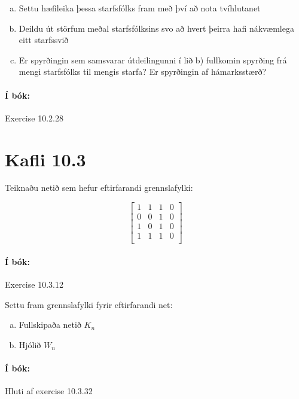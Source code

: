 \documentclass{exam}
\begin{document}
\begin{questions}
\begin{enumerate}[a)]
 \item Settu hæfileika þessa starfsfólks fram með því að nota tvíhlutanet
 \item Deildu út störfum meðal starfsfólksins svo að hvert þeirra hafi nákvæmlega eitt starfssvið
 \item Er spyrðingin sem samsvarar útdeilingunni í lið b) fullkomin spyrðing frá mengi starfsfólks til mengis starfa? Er spyrðingin af hámarksstærð?
\end{enumerate}

\paragraph{Í bók:} Exercise 10.2.28

\section{Kafli 10.3}

\question Teiknaðu netið sem hefur eftirfarandi grennslafylki:

\[
\begin{bmatrix}
1&1&1&0\\
0&0&1&0\\
1&0&1&0\\
1&1&1&0\\
\end{bmatrix}
\]

\paragraph{Í bók:} Exercise 10.3.12

\question Settu fram grennslafylki fyrir eftirfarandi net:

\begin{enumerate}[a)]
 \item Fullskipaða netið $K_n$
 \item Hjólið $W_n$
\end{enumerate}

\paragraph{Í bók:} Hluti af exercise 10.3.32



\end{questions}
\end{document}
